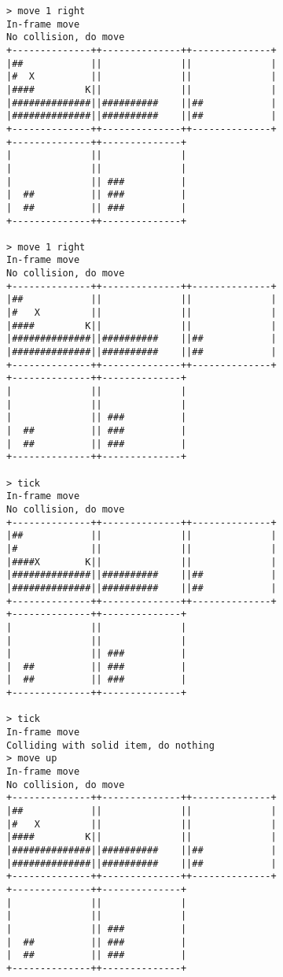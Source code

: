 \begin{verbatim}
> move 1 right
In-frame move
No collision, do move
+--------------++--------------++--------------+
|##            ||              ||              |
|#  X          ||              ||              |
|####         K||              ||              |
|##############||##########    ||##            |
|##############||##########    ||##            |
+--------------++--------------++--------------+
+--------------++--------------+                
|              ||              |                
|              ||              |                
|              || ###          |                
|  ##          || ###          |                
|  ##          || ###          |                
+--------------++--------------+                

> move 1 right
In-frame move
No collision, do move
+--------------++--------------++--------------+
|##            ||              ||              |
|#   X         ||              ||              |
|####         K||              ||              |
|##############||##########    ||##            |
|##############||##########    ||##            |
+--------------++--------------++--------------+
+--------------++--------------+                
|              ||              |                
|              ||              |                
|              || ###          |                
|  ##          || ###          |                
|  ##          || ###          |                
+--------------++--------------+                

> tick
In-frame move
No collision, do move
+--------------++--------------++--------------+
|##            ||              ||              |
|#             ||              ||              |
|####X        K||              ||              |
|##############||##########    ||##            |
|##############||##########    ||##            |
+--------------++--------------++--------------+
+--------------++--------------+                
|              ||              |                
|              ||              |                
|              || ###          |                
|  ##          || ###          |                
|  ##          || ###          |                
+--------------++--------------+                

> tick
In-frame move
Colliding with solid item, do nothing
> move up
In-frame move
No collision, do move
+--------------++--------------++--------------+
|##            ||              ||              |
|#   X         ||              ||              |
|####         K||              ||              |
|##############||##########    ||##            |
|##############||##########    ||##            |
+--------------++--------------++--------------+
+--------------++--------------+                
|              ||              |                
|              ||              |                
|              || ###          |                
|  ##          || ###          |                
|  ##          || ###          |                
+--------------++--------------+                


\end{verbatim}
